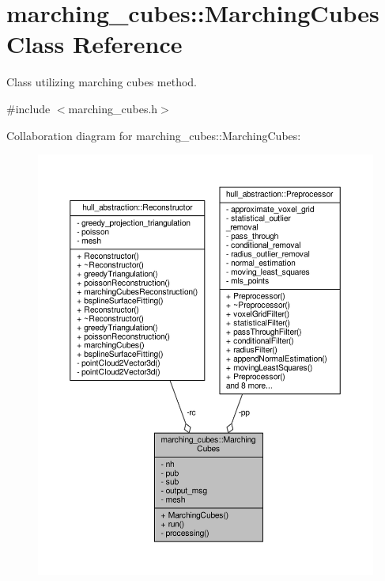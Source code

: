 \hypertarget{classmarching__cubes_1_1_marching_cubes}{}\section{marching\+\_\+cubes\+:\+:Marching\+Cubes Class Reference}
\label{classmarching__cubes_1_1_marching_cubes}


Class utilizing marching cubes method.  




{\ttfamily \#include $<$marching\+\_\+cubes.\+h$>$}



Collaboration diagram for marching\+\_\+cubes\+:\+:Marching\+Cubes\+:
\nopagebreak
\begin{figure}[H]
\begin{center}
\leavevmode
\includegraphics[width=350pt]{classmarching__cubes_1_1_marching_cubes__coll__graph}
\end{center}
\end{figure}
